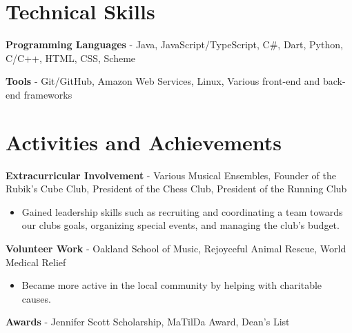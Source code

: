 \documentclass{article}
\newcommand{\resumesection}[1]{
	\section*{\Large\textbf{#1}}
	\hrulefill
	\vspace{1ex}
}
\begin{document}

\resumesection{Technical Skills}

\vspace{.2ex}

\textbf{Programming Languages} -  Java, JavaScript/TypeScript, C\#, Dart, Python, C/C++, HTML, CSS, Scheme


\textbf{Tools} - Git/GitHub, Amazon Web Services, Linux, Various front-end and back-end frameworks %

\vspace{.5ex}


\resumesection{Activities and Achievements}

\vspace{.2ex}

\textbf {Extracurricular Involvement} - Various Musical Ensembles, Founder of the Rubik's Cube Club, President of the Chess Club, President of the Running Club


	\begin{itemize}
		\item Gained leadership skills such as recruiting and coordinating a team towards our clubs goals, organizing special events, and managing the club's budget.
	\end{itemize}

\textbf {Volunteer Work} - Oakland School of Music, Rejoyceful Animal Rescue, World Medical Relief

	\begin{itemize}
		\item Became more active in the local community by helping with charitable causes.
	\end{itemize}

\textbf {Awards} - Jennifer Scott Scholarship, MaTilDa Award, Dean's List
\end{document}
